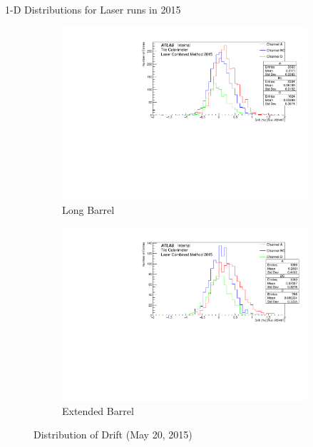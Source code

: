 \documentclass{beamer}
\begin{document}
\begin{frame}{1-D Distributions for Laser runs in 2015}
\begin{figure}[H]
\centering
\begin{subfigure} [t] {0.49\textwidth}
\includegraphics[width=\textwidth]{LB1.pdf}
\caption{Long Barrel}
\end{subfigure}
\begin{subfigure} [t] {0.49\textwidth}
\includegraphics[width=\textwidth]{EB1.pdf}
\caption{Extended Barrel}
\end{subfigure}
\caption{Distribution of Drift (May 20, 2015)}
\end{figure}
\end{frame}
\end{document}
